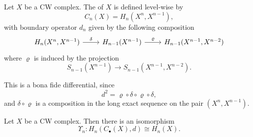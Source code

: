 \documentclass[main.tex]{subfiles}
\begin{document}
\begin{definition}
  \label{def:cellular_chain_complex}
  Let $X$ be a CW complex. The  of $X$ is defined level-wise by
  \begin{equation*}
    C_{n}(X) = H_{n}(X^{n}, X^{n-1}),
  \end{equation*}
  with boundary operator $d_{n}$ given by the following composition
  \begin{equation*}
    \begin{tikzcd}
      H_{n}(X^{n}, X^{n-1})
      \arrow[r, "\delta"]
      & H_{n-1}(X^{n-1})
      \arrow[r, "\varrho"]
      & H_{n-1}(X^{n-1}, X^{n-2})
    \end{tikzcd}
  \end{equation*}
  where $\varrho$ is induced by the projection
  \begin{equation*}
    S_{n-1}(X^{n-1}) \to S_{n-1}(X^{n-1}, X^{n-2}).
  \end{equation*}
\end{definition}

This is a bona fide differential, since
\begin{equation*}
  d^{2} = \varrho \circ \delta \circ \varrho \circ \delta,
\end{equation*}
and $\delta \circ \varrho$ is a composition in the long exact sequence on the pair $(X^{n}, X^{n-1})$.

\begin{theorem}
  Let $X$ be a CW complex. Then there is an isomorphism
  \begin{equation*}
    \Upsilon_{n}\colon H_{n}(C_{\bullet}(X), d) \cong H_{n}(X).
  \end{equation*}
\end{theorem}
\end{document}
